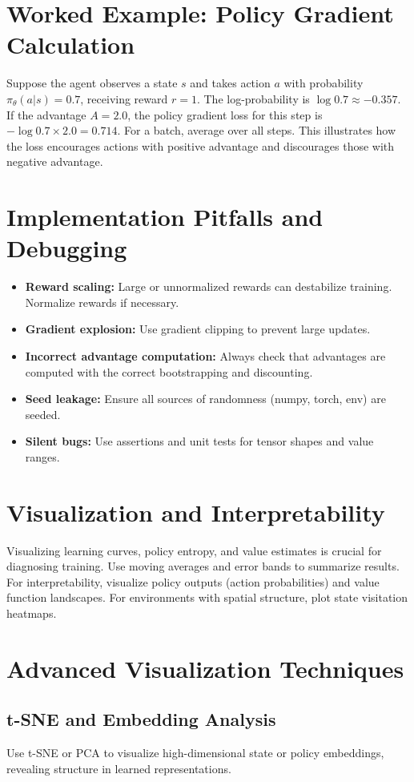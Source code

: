 \documentclass[11pt]{article}
\begin{document}
\section{Worked Example: Policy Gradient Calculation}
Suppose the agent observes a state $s$ and takes action $a$ with probability $\pi_\theta(a|s) = 0.7$, receiving reward $r=1$. The log-probability is $\log 0.7 \approx -0.357$. If the advantage $A = 2.0$, the policy gradient loss for this step is $-\log 0.7 \times 2.0 = 0.714$. For a batch, average over all steps. This illustrates how the loss encourages actions with positive advantage and discourages those with negative advantage.

\section{Implementation Pitfalls and Debugging}
\begin{itemize}
  \item \textbf{Reward scaling:} Large or unnormalized rewards can destabilize training. Normalize rewards if necessary.
  \item \textbf{Gradient explosion:} Use gradient clipping to prevent large updates.
  \item \textbf{Incorrect advantage computation:} Always check that advantages are computed with the correct bootstrapping and discounting.
  \item \textbf{Seed leakage:} Ensure all sources of randomness (numpy, torch, env) are seeded.
  \item \textbf{Silent bugs:} Use assertions and unit tests for tensor shapes and value ranges.
\end{itemize}

\section{Visualization and Interpretability}
Visualizing learning curves, policy entropy, and value estimates is crucial for diagnosing training. Use moving averages and error bands to summarize results. For interpretability, visualize policy outputs (action probabilities) and value function landscapes. For environments with spatial structure, plot state visitation heatmaps.

\section{Advanced Visualization Techniques}
\subsection{t-SNE and Embedding Analysis}
Use t-SNE or PCA to visualize high-dimensional state or policy embeddings, revealing structure in learned representations.
\end{document}
